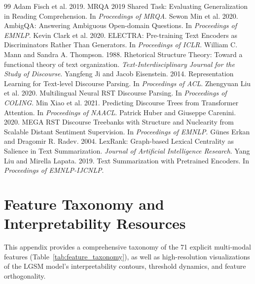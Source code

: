 \documentclass[11pt,a4paper,twocolumn]{article}
\begin{document}
\begin{thebibliography}{99}
 Adam Fisch et al. 2019. MRQA 2019 Shared Task: Evaluating Generalization in Reading Comprehension. In \textit{Proceedings of MRQA}.
 Sewon Min et al. 2020. AmbigQA: Answering Ambiguous Open-domain Questions. In \textit{Proceedings of EMNLP}.
 Kevin Clark et al. 2020. ELECTRA: Pre-training Text Encoders as Discriminators Rather Than Generators. In \textit{Proceedings of ICLR}.
 William C. Mann and Sandra A. Thompson. 1988. Rhetorical Structure Theory: Toward a functional theory of text organization. \textit{Text-Interdisciplinary Journal for the Study of Discourse}.
 Yangfeng Ji and Jacob Eisenstein. 2014. Representation Learning for Text-level Discourse Parsing. In \textit{Proceedings of ACL}.
 Zhengyuan Liu et al. 2020. Multilingual Neural RST Discourse Parsing. In \textit{Proceedings of COLING}.
 Min Xiao et al. 2021. Predicting Discourse Trees from Transformer Attention. In \textit{Proceedings of NAACL}.
 Patrick Huber and Giuseppe Carenini. 2020. MEGA RST Discourse Treebanks with Structure and Nuclearity from Scalable Distant Sentiment Supervision. In \textit{Proceedings of EMNLP}.
 G{\"u}nes Erkan and Dragomir R. Radev. 2004. LexRank: Graph-based Lexical Centrality as Salience in Text Summarization. \textit{Journal of Artificial Intelligence Research}.
 Yang Liu and Mirella Lapata. 2019. Text Summarization with Pretrained Encoders. In \textit{Proceedings of EMNLP-IJCNLP}.
\end{thebibliography}

\clearpage
\onecolumn
\appendix

\section{Feature Taxonomy and Interpretability Resources}

This appendix provides a comprehensive taxonomy of the 71 explicit multi-modal features (Table~\ref{tab:feature_taxonomy}), as well as high-resolution visualizations of the LGSM model's interpretability contours, threshold dynamics, and feature orthogonality.
\end{document}
